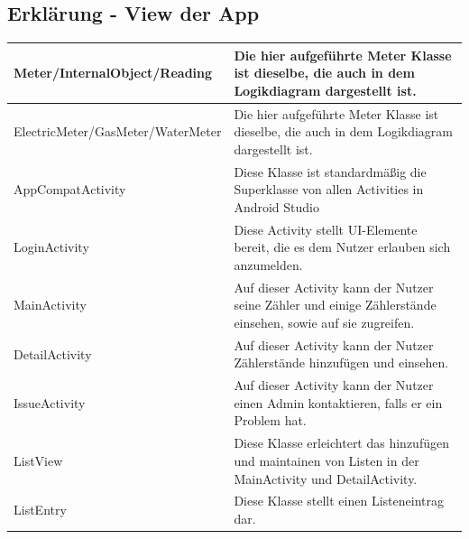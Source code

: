 \newpage

\subsection*{Erklärung - View der App}
\begin{tabularx}{15cm}{XX}
	\hline
	Meter/InternalObject/Reading & Die hier aufgeführte Meter Klasse ist dieselbe, die auch in dem Logikdiagram dargestellt ist. \\ \hline
	ElectricMeter/GasMeter/WaterMeter & Die hier aufgeführte Meter Klasse ist dieselbe, die auch in dem Logikdiagram dargestellt ist. \\ \hline
	AppCompatActivity & Diese Klasse ist standardmäßig die Superklasse von allen Activities in Android Studio \\ \hline
	LoginActivity & Diese Activity stellt UI-Elemente bereit, die es dem Nutzer erlauben sich anzumelden. \\ \hline
	MainActivity & Auf dieser Activity kann der Nutzer seine Zähler und einige Zählerstände einsehen, sowie auf sie zugreifen. \\ \hline
	DetailActivity & Auf dieser Activity kann der Nutzer Zählerstände hinzufügen und einsehen. \\ \hline
	IssueActivity & Auf dieser Activity kann der Nutzer einen Admin kontaktieren, falls er ein Problem hat. \\ \hline
	ListView & Diese Klasse erleichtert das hinzufügen und maintainen von Listen in der MainActivity und DetailActivity. \\ \hline
	ListEntry & Diese Klasse stellt einen Listeneintrag dar. 
\end{tabularx}